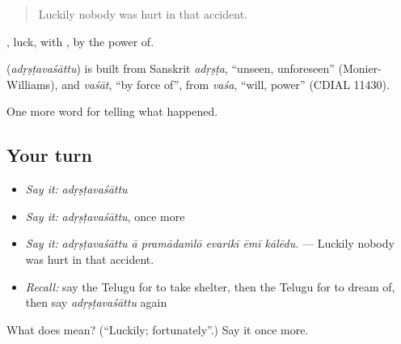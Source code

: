 \begin{quote}
Luckily nobody was hurt in that accident.
\end{quote}

, luck, with , by the power of.

\begin{cousinweb}
\textbf{} (\emph{adṛṣṭavaśāttu}) is built from Sanskrit \emph{adṛṣṭa}, \textquotedblleft{}unseen, unforeseen\textquotedblright{} (Monier-Williams), and \emph{vaśāt}, \textquotedblleft{}by force of\textquotedblright{}, from \emph{vaśa}, \textquotedblleft{}will, power\textquotedblright{} (CDIAL 11430).
\end{cousinweb}

\begin{grammarlens}[title={What you've built}]
One more word for telling what happened.
\end{grammarlens}

\subsection*{Your turn}
\begin{itemize}
\raggedright
  \item \emph{Say it:} \emph{adṛṣṭavaśāttu}
  \item \emph{Say it:} \emph{adṛṣṭavaśāttu}, once more
  \item \emph{Say it:} \emph{adṛṣṭavaśāttu ā pramādaṁlō evarikī ēmī kālēdu.} — Luckily nobody was hurt in that accident.
  \item \emph{Recall:} say the Telugu for to take shelter, then the Telugu for to dream of, then say \emph{adṛṣṭavaśāttu} again
\end{itemize}

\begin{tcolorbox}[breakable,colback=teal!4,colframe=teal!35!black,title={Before you move on}]
What does  mean? (\textquotedblleft{}Luckily; fortunately\textquotedblright{}.) Say it once more.
\end{tcolorbox}
